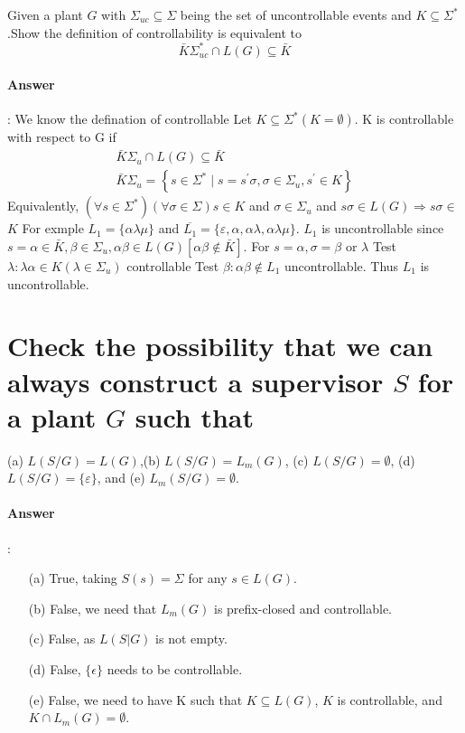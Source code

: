 \documentclass{article}
\begin{document}
Given a plant $G$ with $\Sigma_{u c} \subseteq \Sigma$ being the set of uncontrollable events and $K \subseteq \Sigma^*$.Show the definition of controllability is equivalent to
$$
\bar{K} \Sigma_{u c}^* \cap L(G) \subseteq \bar{K}
$$

\paragraph{Answer}:
We know the defination of controllable Let $K \subseteq \Sigma^*(K=\emptyset)$. K is controllable with respect to $\mathrm{G}$ if
$$
\begin{array}{r}
\bar{K} \Sigma_u \cap L(G) \subseteq \bar{K} \\
\bar{K} \Sigma_u=\left\{s \in \Sigma^* \mid s=s^{\prime} \sigma, \sigma \in \Sigma_u, s^{\prime} \in K\right\}
\end{array}
$$
Equivalently, $\left(\forall s \in \Sigma^*\right)(\forall \sigma \in \Sigma) s \in K$ and $\sigma \in \Sigma_u$ and $s \sigma \in L(G) \Rightarrow s \sigma \in$
$K$
For exmple $L_1=\{\alpha \lambda \mu\}$ and $\overline{L_1}=\{\varepsilon, \alpha, \alpha \lambda, \alpha \lambda \mu\}$. $L_1$ is uncontrollable since $s=\alpha \in \bar{K}, \beta \in \Sigma_u, \alpha \beta \in L(G)[\alpha \beta \notin \bar{K}]$. For $s=\alpha, \sigma=\beta$ or $\lambda$
Test $\lambda: \lambda \alpha \in K\left(\lambda \in \Sigma_u\right)$ controllable
Test $\beta: \alpha \beta \notin L_1$ uncontrollable. Thus $L_1$ is uncontrollable.


\section{Check the possibility that we can always construct a supervisor $S$ for a plant $G$ such that}
(a) $L(S / G)=L(G)$,(b) $L(S / G)=L_m(G)$, (c) $L(S / G)=\emptyset$, (d) $L(S / G)=\{\varepsilon\}$, and (e) $L_m(S / G)=\emptyset$.


\paragraph{Answer}:
\begin{itemize}
  \item[(a)] True, taking $S(s) = \Sigma$ for any $s \in L(G)$.
  \item[(b)] False, we need that $L_m(G)$ is prefix-closed and controllable. 
  \item[(c)] False, as $L(S|G)$ is not empty.
  \item[(d)] False, $\{\epsilon\}$ needs to be controllable.
  \item[(e)] False, we need to have K such that $K \subseteq L(G)$, $K$ is controllable, and $K \cap L_m(G) = \emptyset$. 
\end{itemize}
\end{document}
